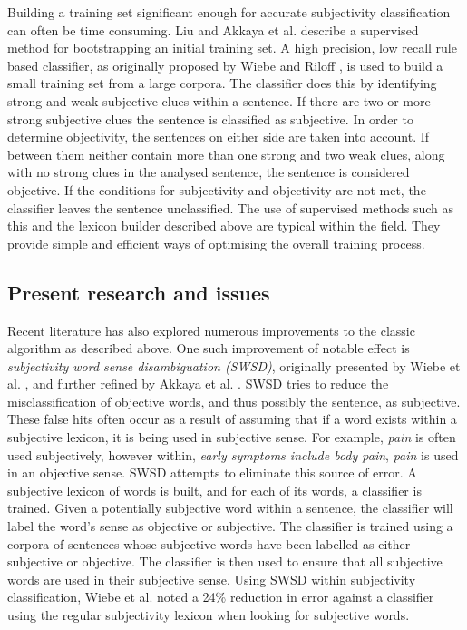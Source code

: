 Building a training set significant enough for accurate subjectivity classification can often be time consuming. Liu \cite{Liu:2010tm} and Akkaya et al. \cite{Akkaya:2009ww} describe a supervised method for bootstrapping an initial training set. A high precision, low recall rule based classifier, as originally proposed by Wiebe and Riloff \cite{Wiebe:2003wa}, is used to build a small training set from a large corpora. The classifier does this by identifying strong and weak subjective clues within a sentence. If there are two or more strong subjective clues the sentence is classified as subjective. In order to determine objectivity, the sentences on either side are taken into account. If between them neither contain more than one strong and two weak clues, along with no strong clues in the analysed sentence, the sentence is considered objective. If the conditions for subjectivity and objectivity are not met, the classifier leaves the sentence unclassified. The use of supervised methods such as this and the lexicon builder described above are typical within the field. They provide simple and efficient ways of optimising the overall training process.

\subsection{Present research and issues}

Recent literature has also explored numerous improvements to the classic algorithm as described above. One such improvement of notable effect is \emph{subjectivity word sense disambiguation (SWSD)}, originally presented by Wiebe et al. \cite{Wiebe:2006te}, and further refined by Akkaya et al. \cite{Akkaya:2009ww}. SWSD tries to reduce the misclassification of objective words, and thus possibly the sentence, as subjective. These false hits often occur as a result of assuming that if a word exists within a subjective lexicon, it is being used in subjective sense. For example, \emph{pain} is often used subjectively, however within, \emph{early symptoms include body pain}, \emph{pain} is used in an objective sense. SWSD attempts to eliminate this source of error. A subjective lexicon of words is built, and for each of its words, a classifier is trained. Given a potentially subjective word within a sentence, the classifier will label the word's sense as objective or subjective. The classifier is trained using a corpora of sentences whose subjective words have been labelled as either subjective or objective. The classifier is then used to ensure that all subjective words are used in their subjective sense. Using SWSD within subjectivity classification, Wiebe et al. \cite{Akkaya:2009ww} noted a 24\% reduction in error against a classifier using the regular subjectivity lexicon when looking for subjective words. 


